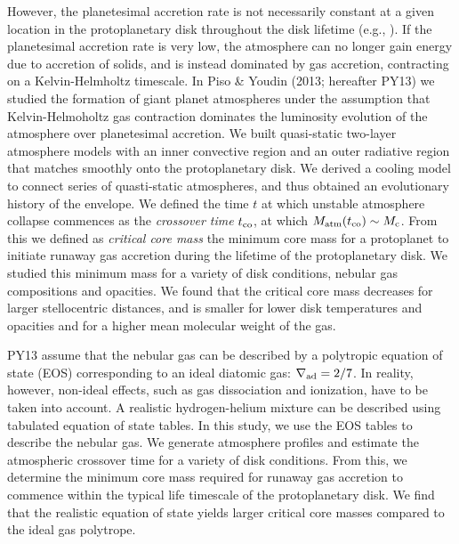 \documentclass[apj]{emulateapj}
\newcommand{\delad}{\nabla_{\rm ad}}
\begin{document}
However, the planetesimal accretion rate is not necessarily constant at a given location in the protoplanetary disk throughout the disk lifetime (e.g., \citealt{ikoma00}). If the planetesimal accretion rate is very low, the atmosphere can no longer gain energy due to accretion of solids, and is instead dominated by gas accretion, contracting on a Kelvin-Helmholtz timescale. In Piso \& Youdin (2013; hereafter PY13) we studied the formation of giant planet atmospheres under the assumption that Kelvin-Helmoholtz gas contraction dominates the luminosity evolution of the atmosphere over planetesimal accretion. We built quasi-static two-layer atmosphere models with an inner convective region and an outer radiative region that matches smoothly onto the protoplanetary disk. We derived a cooling model to connect series of quasti-static atmospheres, and thus obtained an evolutionary history of the envelope. We defined the time $t$ at which unstable atmosphere collapse commences as the \textit{crossover time} $t_{\rm{co}}$, at which  $M_{\rm atm}(t_{\rm{co}})\sim M_{\rm c}$. From this we defined as \textit{critical core mass} the minimum core mass for a protoplanet to initiate runaway gas accretion during the lifetime of the protoplanetary disk. We studied this minimum mass for a variety of disk conditions, nebular gas compositions and opacities. We found that the critical core mass decreases for larger stellocentric distances, and is smaller for lower disk temperatures and opacities and for a higher mean molecular weight of the gas. 
 
 
 PY13 assume that the nebular gas can be described by a polytropic equation of state (EOS) corresponding to an ideal diatomic gas: $\delad=2/7$. In reality, however, non-ideal effects, such as gas dissociation and ionization, have to be taken into account. A realistic hydrogen-helium mixture can be described using tabulated equation of state tables. In this study, we use the \cite{saumon95} EOS tables to describe the nebular gas. We generate atmosphere profiles and estimate the atmospheric crossover time for a variety of disk conditions. From this, we determine the minimum core mass required for runaway gas accretion to commence within the typical life timescale of the protoplanetary disk.  We find that the realistic equation of state yields larger critical core masses compared to the ideal gas polytrope. %
\end{document}
